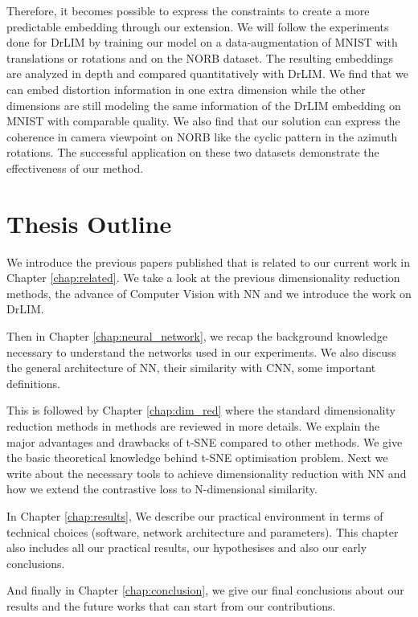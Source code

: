 \documentclass[a4paper,12pt]{report}
\begin{document}
Therefore, it becomes possible to express the constraints to create a more predictable embedding through our extension.
We will follow the experiments done for DrLIM by training our model on a data-augmentation of MNIST with translations or rotations and on the NORB dataset.
The resulting embeddings are analyzed in depth and compared quantitatively with DrLIM.
We find that we can embed distortion information in one extra dimension while the other dimensions are still modeling the same information of the DrLIM embedding on MNIST with comparable quality.
We also find that our solution can express the coherence in camera viewpoint on NORB like the cyclic pattern in the azimuth rotations.
The successful application on these two datasets demonstrate the effectiveness of our method.

\section{Thesis Outline}
We introduce the previous papers published that is related to our current work in Chapter \ref{chap:related}.
We take a look at the previous dimensionality reduction methods, the advance of Computer Vision with NN and we introduce the work on DrLIM.

Then in Chapter \ref{chap:neural_network}, we recap the background knowledge necessary to understand the networks used in our experiments.
We also discuss the general architecture of NN, their similarity with CNN, some important definitions.

This is followed by Chapter \ref{chap:dim_red} where the standard dimensionality reduction methods in methods are reviewed in more details.
We explain the major advantages and drawbacks of t-SNE compared to other methods.
We give the basic theoretical knowledge behind t-SNE optimisation problem.
Next we write about the necessary tools to achieve dimensionality reduction with NN and how we extend the contrastive loss to N-dimensional similarity.

In Chapter \ref{chap:results}, We describe our practical environment in terms of technical choices (software, network architecture and parameters).
This chapter also includes all our practical results, our hypothesises and also our early conclusions.

And finally in Chapter \ref{chap:conclusion}, we give our final conclusions about our results and the future works that can start from our contributions.
\end{document}
